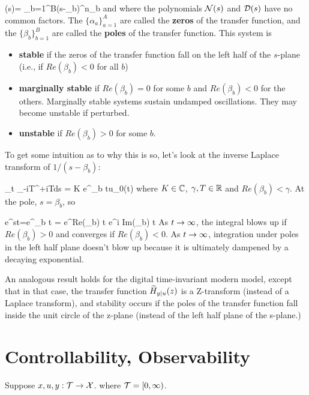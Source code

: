 \beq
\cald(s)= \prod_{b=1}^{B}(s-\beta_b)^{n_b}
\eeq
and where 
the polynomials ${\cal N}(s)$ and ${\cal D}(s)$
have no common factors. The $\{\alpha_a\}_{a=1}^A$ are
called the {\bf zeros}
of the transfer function,
and the $\{\beta_b\}_{b=1}^B$ are called the
{\bf poles} of the transfer function.
This system
is 
\begin{itemize}
\item
{\bf stable} if the zeros of the
transfer function fall on the
left half of the $s$-plane (i.e., 
if $Re(\beta_b)<0$ for all $b$)

\item
{\bf marginally stable} if
$Re(\beta_b)=0$ for some $b$
and $Re(\beta_b)<0$
for the others.
Marginally stable systems
sustain undamped oscillations.
They may become unstable
if perturbed.

\item {\bf unstable}
if $Re(\beta_b)> 0$ for some $b$.
\end{itemize}

To get some intuition as to why this is so,
let's look at the inverse Laplace transform 
of $1/(s-\beta_b)$:

\beq
\lim_{t\rarrow \infty}
\int_{\gamma-iT}^{\gamma+iT}ds\;
= K e^{\beta_b t}u_0(t)
\eeq
where $K\in { \mathbb{C}}$,  $\gamma, T\in{ \mathbb{R}}$
and $Re(\beta_b)< \gamma$.
At the pole, $s=\beta_b$, so


\beq
e^{st}=e^{\beta_b t} = e^{Re(\beta_b) t} 
e^{i Im(\beta_b) t}
\eeq
As $t\rightarrow \infty$, 
the integral blows up 
if $Re(\beta_b)>0$ and
converges if $Re(\beta_b)<0$.
As $t\rightarrow \infty$, 
integration under poles in
the left half plane
doesn't
blow up
because it is ultimately
dampened by a decaying
exponential.

An analogous result holds for the
digital time-invariant 
modern model,
except that in that case,
the transfer function ${\widetilde{H}}_{y|u}(z)$
is a Z-transform (instead of a Laplace
transform), and stability
occurs if the poles of the transfer
function fall inside the unit circle 
of the z-plane (instead
of the left half plane
of the s-plane.)



\section{
Controllability,
Observability}
Suppose $x, u, y:{\cal T}\rightarrow {\cal X}$.
 where ${\cal T}=[0, \infty)$.
 

